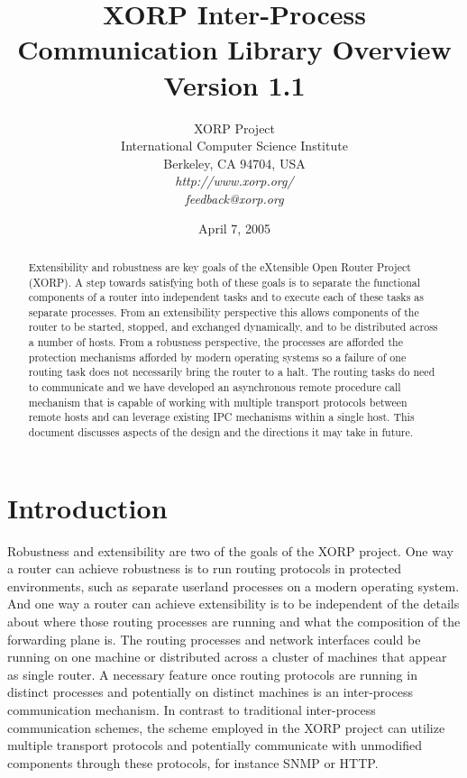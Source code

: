 \documentclass[11pt]{article}
\title{
XORP Inter-Process Communication Library Overview \\
\vspace{1ex} Version 1.1
}
\author{ XORP Project					\\
	 International Computer Science Institute	\\
	 Berkeley, CA 94704, USA			\\
         {\it http://www.xorp.org/}			\\
	 {\it feedback@xorp.org}
}
\date{April 7, 2005}
\begin{document}
\maketitle
\begin{abstract}

Extensibility and robustness are key goals of the eXtensible Open
Router Project (XORP).  A step towards satisfying both of these goals
is to separate the functional components of a router into independent
tasks and to execute each of these tasks as separate processes.  From
an extensibility perspective this allows components of the router to
be started, stopped, and exchanged dynamically, and to be distributed
across a number of hosts.  From a robusness perspective, the processes
are afforded the protection mechanisms afforded by modern operating
systems so a failure of one routing task does not necessarily bring
the router to a halt. The routing tasks do need to communicate and we
have developed an asynchronous remote procedure call mechanism that is
capable of working with multiple transport protocols between remote
hosts and can leverage existing IPC mechanisms within a single
host. This document discusses aspects of the design and the directions
it may take in future.
\end{abstract}

\section{Introduction}

Robustness and extensibility are two of the goals of the XORP project.
One way a router can achieve robustness is to run routing protocols in
protected environments, such as separate userland processes on a
modern operating system.  And one way a router can achieve
extensibility is to be independent of the details about where those
routing processes are running and what the composition of the
forwarding plane is.  The routing processes and network interfaces
could be running on one machine or distributed across a cluster of
machines that appear as single router.  A necessary feature once
routing protocols are running in distinct processes and potentially on
distinct machines is an inter-process communication mechanism.  In
contrast to traditional inter-process communication schemes, the
scheme employed in the XORP project can utilize multiple transport
protocols and potentially communicate with unmodified components
through these protocols, for instance SNMP or HTTP.
\end{document}
